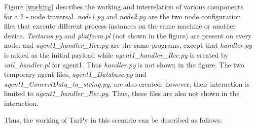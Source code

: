 Figure \ref{working} describes the working and interrelation of various components for a 2 - node traversal. \textit{node1.py} and \textit{node2.py} are the two node configuration files that execute different process instances on the same machine or another device. \textit{Tartarus.py} and \textit{platform.pl} (not shown in the figure) are present on every node.  and \textit{agent1\_handler\_Rec.py} are the same programs, except that \textit{handler.py} is added as the initial payload while \textit{agent1\_handler\_Rec.py} is created by \textit{call\_handler.pl} for agent1. Thus \textit{handler.py} is not shown in the figure. The two temporary agent files, \textit{agent1\_Database.py} and \textit{agent1\_ConvertData\_to\_string.py}, are also created; however, their interaction is limited to \textit{agent1\_handler\_Rec.py}. Thus, these files are also not shown in the interaction.
\par Thus, the working of TarPy in this scenario can be described as follows:
